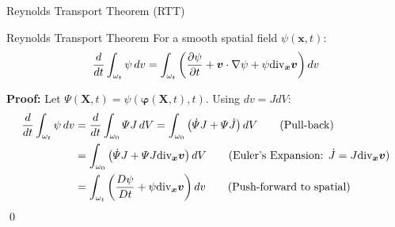 \documentclass[aspectratio=169]{beamer}
\renewcommand{\vec}{\vectorsym}
\begin{document}
\begin{frame}{Reynolds Transport Theorem (RTT)}
    
    \vspace{0.2cm}
    \begin{block}{Reynolds Transport Theorem}
        For a smooth spatial field $\psi(\bm{x}, t)$:
        $$ \frac{d}{dt} \int_{\omega_t} \psi \, dv = \int_{\omega_t} \left( \frac{\partial \psi}{\partial t} + \vec v\cdot \nabla \psi + \psi \text{div}_{\bm{x}} \bm{v} \right) dv $$
    \end{block}
    
    \pause \textbf{Proof:}
    Let $\Psi(\bm{X}, t) = \psi(\bm{\varphi}(\bm{X}, t), t)$. Using $dv = J dV$:
    \begin{align*}
        \frac{d}{dt} \int_{\omega_t} \psi \, dv &= \frac{d}{dt} \int_{\omega_0} \Psi J \, dV = \int_{\omega_0} \left( \dot{\Psi} J + \Psi \dot{J} \right) dV \tag{Pull-back} \\
        &= \int_{\omega_0} \left( \dot{\Psi} J + \Psi J \text{div}_{\bm{x}} \bm{v} \right) dV \tag{Euler's Expansion: $\dot{J} = J \text{div}_{\bm{x}} \bm{v}$} \\
        &= \int_{\omega_t} \left( \frac{D\psi}{Dt} + \psi \text{div}_{\bm{x}} \bm{v} \right) dv \tag{Push-forward to spatial}
    \end{align*} \qed
\end{frame}
\end{document}
